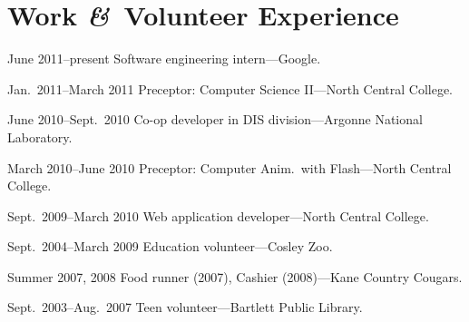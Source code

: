 \documentclass[11pt]{simplecv}
\newcommand*\amp{{\fertigopro\itshape\&}}
\newcommand*\nbds[1][-]{\nobreakdashes#1\hspace{0pt}}
\begin{document}
  \section{Work \amp\ Volunteer Experience}
  \begin{topic}
    \item[June 2011--present] Software engineering intern---Google.
    \item[Jan.\ 2011--March 2011] Preceptor: Computer Science II---North Central College.
    \item[June 2010--Sept.\ 2010] Co\nbds op developer in DIS division---Argonne National Laboratory.
    \item[March 2010--June 2010] Preceptor: Computer Anim.\ with Flash---North Central College.
    \item[Sept.\ 2009--March 2010] Web application developer---North Central College.
    \item[Sept.\ 2004--March 2009] Education volunteer---Cosley Zoo.
    \item[Summer 2007, 2008] Food runner (2007), Cashier (2008)---Kane Country Cougars.
    \item[Sept.\ 2003--Aug.\ 2007] Teen volunteer---Bartlett Public Library.
  \end{topic}
\end{document}

